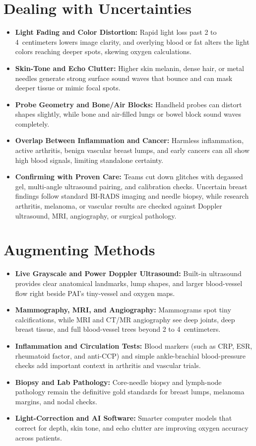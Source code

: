 \section{Dealing with Uncertainties}
\begin{itemize}
  \item \textbf{Light Fading and Color Distortion:} Rapid light loss past 2 to 4~centimeters lowers image clarity, and overlying blood or fat alters the light colors reaching deeper spots, skewing oxygen calculations.
  \item \textbf{Skin-Tone and Echo Clutter:} Higher skin melanin, dense hair, or metal needles generate strong surface sound waves that bounce and can mask deeper tissue or mimic focal spots.
  \item \textbf{Probe Geometry and Bone/Air Blocks:} Handheld probes can distort shapes slightly, while bone and air-filled lungs or bowel block sound waves completely.
  \item \textbf{Overlap Between Inflammation and Cancer:} Harmless inflammation, active arthritis, benign vascular breast lumps, and early cancers can all show high blood signals, limiting standalone certainty.
  \item \textbf{Confirming with Proven Care:} Teams cut down glitches with degassed gel, multi-angle ultrasound pairing, and calibration checks. Uncertain breast findings follow standard BI-RADS imaging and needle biopsy, while research arthritis, melanoma, or vascular results are checked against Doppler ultrasound, MRI, angiography, or surgical pathology.
\end{itemize}

\section{Augmenting Methods}
\begin{itemize}
  \item \textbf{Live Grayscale and Power Doppler Ultrasound:} Built-in ultrasound provides clear anatomical landmarks, lump shapes, and larger blood-vessel flow right beside PAI's tiny-vessel and oxygen maps.
  \item \textbf{Mammography, MRI, and Angiography:} Mammograms spot tiny calcifications, while MRI and CT/MR angiography see deep joints, deep breast tissue, and full blood-vessel trees beyond 2 to 4~centimeters.
  \item \textbf{Inflammation and Circulation Tests:} Blood markers (such as CRP, ESR, rheumatoid factor, and anti-CCP) and simple ankle-brachial blood-pressure checks add important context in arthritis and vascular trials.
  \item \textbf{Biopsy and Lab Pathology:} Core-needle biopsy and lymph-node pathology remain the definitive gold standards for breast lumps, melanoma margins, and nodal checks.
  \item \textbf{Light-Correction and AI Software:} Smarter computer models that correct for depth, skin tone, and echo clutter are improving oxygen accuracy across patients.
\end{itemize}

